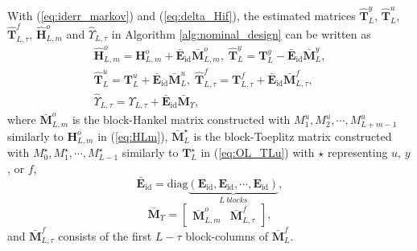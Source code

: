 \documentclass[twocolumn]{autart}
\begin{document}
With (\ref{eq:iderr_markov}) and (\ref{eq:delta_Hif}), the estimated matrices $\mathbf{\hat T}_L^y$, $\mathbf{\hat T}_L^u$, $\mathbf{\hat T}_{L,\tau}^f$, $\mathbf{\hat H}_{L,m}^o$ and $\hat {\Upsilon}_{L,\tau}$ in Algorithm \ref{alg:nominal_design} can be written as
\begin{gather}
\mathbf{\hat H}_{L,m}^o = \mathbf{H}_{L,m}^o + \mathbf{\bar E}_{\mathrm{id}}
\mathbf{\bar M}_{L,m}^o, \;
\mathbf{\hat T}_L^y = \mathbf{T}_L^y - \mathbf{\bar E}_{\mathrm{id}}
 \mathbf{\bar M}_L^y, \label{eq:hatHLm} \\
\mathbf{\hat T}_L^u = \mathbf{T}_L^u + \mathbf{\bar E}_{\mathrm{id}}
 \mathbf{\bar M}_L^u, \;
\mathbf{\hat T}_{L,\tau}^f = \mathbf{T}_{L,\tau}^f + \mathbf{\bar E}_{\mathrm{id}}
 \mathbf{\bar M}_{L,\tau}^f, \\
\hat {\Upsilon}_{L,\tau} = {\Upsilon}_{L,\tau} + \mathbf{\bar E}_{\mathrm{id}} \mathbf{\bar M}_{\Upsilon},
\label{eq:hatPsiLtau}
\end{gather}
where $\mathbf{\bar M}_{L,m}^o$ is the block-Hankel matrix constructed with $M_1^u, M_2^u, \cdots, M_{L+m-1}^u$ similarly to $\mathbf{H}_{L,m}^o$ in (\ref{eq:HLm}), $\mathbf{\bar M}_{L}^\star$ is the block-Toeplitz matrix constructed with $M_0^\star, M_1^\star, \cdots, M_{L-1}^\star$ similarly to $\mathbf{T}_{L}^\star$ in (\ref{eq:OL_TLu}) with $\star$ representing $u$, $y$, or $f$,
\begin{equation}\label{eq:Eidbar}
\mathbf{\bar E}_{\mathrm{id}} = \mathrm{diag}
 \underbrace {\left( \mathbf{E}_{\mathrm{id}}, \mathbf{E}_{\mathrm{id}}, \cdots, \mathbf{E}_{\mathrm{id}} \right)}_{L\;blocks},
\end{equation}
\begin{equation}\label{eq:Mbarf}
\mathbf{\bar M}_{\Upsilon} = \left[ \begin{array}{cc}
                                 \mathbf{\bar M}_{L,m}^o  & \mathbf{\bar M}_{L,\tau}^f
                                \end{array} \right],
\end{equation}
and $\mathbf{\bar M}_{L,\tau}^f$ consists of the first $L-\tau$ block-columns of $\mathbf{\bar M}_{L}^f$.
\end{document}
